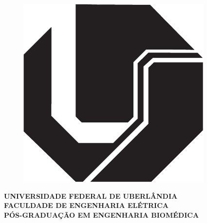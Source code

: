 

\thispagestyle{empty}                                               %

\begin{center}

\begin{figure}[h]
\begin{center}
{\includegraphics[scale = 0.4]{img/logo_ufu}}
\end{center}
\end{figure}

\bf{\large{UNIVERSIDADE FEDERAL DE UBERLÂNDIA}} \\
\bf{\large{FACULDADE DE ENGENHARIA ELÉTRICA}} \\
\bf{\large{PÓS-GRADUAÇÃO EM ENGENHARIA BIOMÉDICA}}\\

\vskip 110pt
\bf \large{\@titulo}

\vskip 150pt
\large{\@author} \par
\vfill
\@city \\ \@year
\end{center}
